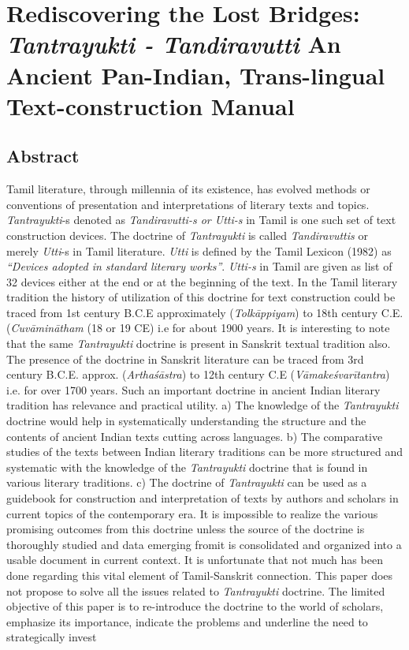 
\chapter{Rediscovering the Lost Bridges: \textit{Tantrayukti - Tandiravutti} An Ancient Pan-Indian, Trans-lingual Text-construction Manual}



\section*{Abstract}

Tamil literature, through millennia of its existence, has evolved methods or conventions of presentation and interpretations of literary texts and topics. \textit{Tantrayukti}-s denoted as \textit{Tandiravutti-s or Utti-s} in Tamil is one such set of text construction devices. The doctrine of \textit{Tantrayukti} is called \textit{Tandiravuttis} or merely \textit{Utti}-s in Tamil literature. \textit{Utti} is defined by the Tamil Lexicon (1982) as \textit{“Devices adopted in standard literary works”}. \textit{Utti-s} in Tamil are given as list of 32 devices either at the end or at the beginning of the text. In the Tamil literary tradition the history of utilization of this doctrine for text construction could be traced from 1st century B.C.E approximately (\textit{Tolkāppiyam}) to 18th century C.E. (\textit{Cuvāminātham} (18 or 19 CE) i.e for about 1900 years. It is interesting to note that the same \textit{Tantrayukti} doctrine is present in Sanskrit textual tradition also. The presence of the doctrine in Sanskrit literature can be traced from 3rd century B.C.E. approx. (\textit{Arthaśāstra}) to 12th century C.E (\textit{Vāmakeśvarītantra}) i.e. for over 1700 years. Such an important doctrine in ancient Indian literary tradition has relevance and practical utility. a) The knowledge of the \textit{Tantrayukti} doctrine would help in systematically understanding the structure and the contents of ancient Indian texts cutting across languages. b) The comparative studies of the texts between Indian literary traditions can be more structured and systematic with the knowledge of the \textit{Tantrayukti} doctrine that is found in various literary traditions. c) The doctrine of \textit{Tantrayukti} can be used as a guidebook for construction and interpretation of texts by authors and scholars in current topics of the contemporary era. It is impossible to realize the various promising outcomes from this doctrine unless the source of the doctrine is thoroughly studied and data emerging fromit is consolidated and organized into a usable document in current context. It is unfortunate that not much has been done regarding this vital element of Tamil-Sanskrit connection. This paper does not propose to solve all the issues related to \textit{Tantrayukti} doctrine. The limited objective of this paper is to re-introduce the doctrine to the world of scholars, emphasize its importance, indicate the problems and underline the need to strategically invest 